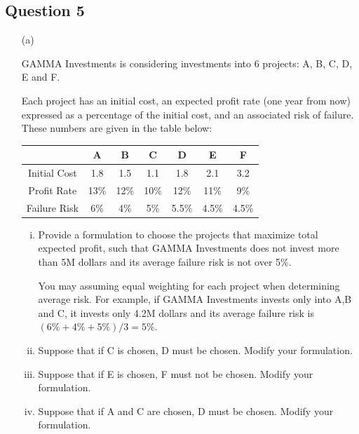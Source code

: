 \documentclass[12pt]{article}
\begin{document}
		\subsection*{Question 5}
		\begin{itemize}

			\item[(a)] 
			
			GAMMA Investments is considering investments into 6 projects: A, B, C, D, E and F.
			
			Each project has an initial cost, an expected profit rate (one year from now) expressed as a
			percentage of the initial cost, and an associated risk of failure.
			These numbers are given in the table below:
			
			\begin{center}
			\begin{tabular}{|c||c|c|c|c|c|c|}
				\hline  & A & B & C & D & E & F \\ 
				\hline Initial Cost & 1.8 & 1.5 & 1.1 & 1.8 & 2.1 & 3.2 \\ 
				\hline Profit Rate & 13\% & 12\% & 10\% & 12\% & 11\% & 9\% \\ 
				\hline Failure Risk & 6\% & 4\% & 5\% & 5.5\% & 4.5\%  & 4.5\%\\ 
				\hline 
			\end{tabular} 
		\end{center}
			\begin{enumerate}[(i)] \item  Provide a formulation to choose the projects that maximize total
				expected profit, such that GAMMA Investments does not invest more than
				5M dollars and its average failure risk is not over 5\%. 
				
				You may assuming equal weighting for each project when determining average risk. For example, if GAMMA Investments invests only into A,B and C, it invests
				only 4.2M dollars and its average failure risk is $(6\%+4\% +5\%)/3=5\%$.
				
				\item Suppose that if C is chosen, D must be chosen. Modify your
				formulation.
				\item Suppose that if E is chosen, F must not be chosen. Modify your
				formulation.
				\item   Suppose that if A and C are chosen, D must be chosen. Modify your
				formulation.
			\end{enumerate}


\end{itemize}
\end{document}
